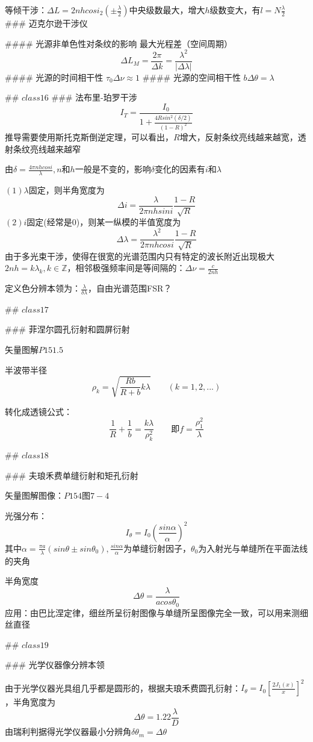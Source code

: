 \documentclass[12pt]{ctexart}
\begin{document}
等倾干涉：$\Delta L=2nhcosi_2(\pm\frac{\lambda}{2})$中央级数最大，增大$h$级数变大，有$l=N\frac{\lambda}{2}$
### 迈克尔逊干涉仪

#### 光源非单色性对条纹的影响
最大光程差（空间周期）
$$\Delta L_M=\frac{2\pi}{\Delta k}=\frac{\lambda^2}{|\Delta \lambda|}$$
#### 光源的时间相干性
$\tau_0\Delta\nu\approx1$
#### 光源的空间相干性
$b\Delta \theta=\lambda$

## $class16$
### 法布里-珀罗干涉
$$I_T=\frac{I_0}{1+\frac{4Rsin^2(\delta/2)}{(1-R)^2}}$$
推导需要使用斯托克斯倒逆定理，可以看出，$R$增大，反射条纹亮线越来越宽，透射条纹亮线越来越窄

由$\delta=\frac{4\pi nhcosi}{\lambda},n$和$h$一般是不变的，影响$\delta$变化的因素有$i$和$\lambda$

$(1)\lambda$固定，则半角宽度为
$$\Delta i=\frac{\lambda}{2\pi nhsini}\frac{1-R}{\sqrt{R}}$$
$(2)i$固定(经常是0)，则某一纵模的半值宽度为
$$\Delta \lambda=\frac{\lambda^2}{2\pi nhcosi}\frac{1-R}{\sqrt{R}}$$
由于多光束干涉，使得在很宽的光谱范围内只有特定的波长附近出现极大$2nh=k\lambda_k,k\in\mathbb{Z}$，相邻极强频率间是等间隔的：$\Delta\nu=\frac{c}{2nh}$

定义色分辨本领为：$\frac{\lambda}{\delta \lambda}$，自由光谱范围FSR？

## $class17$

### 菲涅尔圆孔衍射和圆屏衍射

矢量图解$P151.5$

半波带半径
$$\rho_k=\sqrt{\frac{Rb}{R+b}k\lambda}\qquad (k=1,2,...)$$

转化成透镜公式：
$$\frac{1}{R}+\frac{1}{b}=\frac{k\lambda}{\rho_k^2}\qquad \text{即}f=\frac{\rho_1^2}{\lambda}$$

## $class18$

### 夫琅禾费单缝衍射和矩孔衍射

矢量图解图像：$P154图7-4$

光强分布：
$$I_\theta=I_0(\frac{sin\alpha}{\alpha})^2$$
其中$\alpha=\frac{\pi a}{\lambda}(sin\theta\pm sin\theta_0),\frac{sin\alpha}{\alpha}$为单缝衍射因子，$\theta_0$为入射光与单缝所在平面法线的夹角

半角宽度
$$\Delta\theta=\frac{\lambda}{acos\theta_0}$$
应用：由巴比涅定律，细丝所呈衍射图像与单缝所呈图像完全一致，可以用来测细丝直径

## $class19$

### 光学仪器像分辨本领

由于光学仪器光具组几乎都是圆形的，根据夫琅禾费圆孔衍射：$I_\theta=I_0[\frac{2J_1(x)}{x}]^2$，半角宽度为
$$\Delta\theta=1.22\frac{\lambda}{D}$$
由瑞利判据得光学仪器最小分辨角$\delta\theta_m=\Delta\theta$
\end{document}
